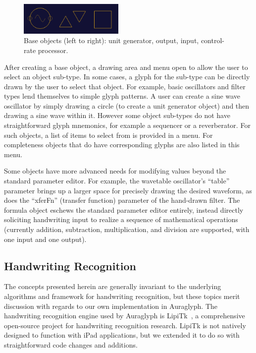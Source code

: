 \documentclass{nime-alternate}
\begin{document}
\begin{figure}[h]
	\centering
		\includegraphics[width=0.45\textwidth]{figures/baseobjects.png}
	\caption{Base objects (left to right): unit generator, output, input, control-rate processor.}
	\label{fig:baseObjects}
\end{figure}

After creating a base object, a drawing area and menu open to allow the user to select an object sub-type. 
In some cases, a glyph for the sub-type can be directly drawn by the user to select that object. 
For example, basic oscillators and filter types lend themselves to simple glyph patterns. 
A user can create a sine wave oscillator by simply drawing a circle (to create a unit generator object) and then drawing a sine wave within it. 
However some object sub-types do not have straightforward glyph mnemonics, for example a sequencer or a reverberator. 
For such objects, a list of items to select from is provided in a menu. 
For completeness objects that do have corresponding glyphs are also listed in this menu. 

Some objects have more advanced needs for modifying values beyond the standard parameter editor.  
For example, the wavetable oscillator's ``table'' parameter brings up a larger space for precisely drawing the desired waveform, as does the ``xferFn'' (transfer function) parameter of the hand-drawn filter. 
The formula object eschews the standard parameter editor entirely, instead directly soliciting handwriting input to realize a sequence of mathematical operations (currently addition, subtraction, multiplication, and division are supported, with one input and one output). 

\subsection{Handwriting Recognition}
\label{sec:HandwritingRecognition}

The concepts presented herein are generally invariant to the underlying algorithms and framework for handwriting recognition, but these topics merit discussion with regards to our own implementation in Auraglyph. 
The handwriting recognition engine used by Auraglyph is LipiTk~\cite{madhvanath2007lipitk}, a comprehensive open-source project for handwriting recognition research. 
LipiTk is not natively designed to function with iPad applications, but we extended it to do so with straightforward code changes and additions. 
\end{document}
